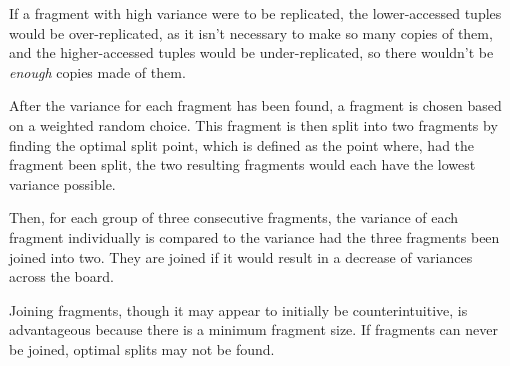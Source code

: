 \documentclass{brandiss}
\numberwithin{section}{chapter}
\numberwithin{figure}{chapter}
\theoremstyle{definition}
\theoremstyle{plain}
\theoremstyle{remark}
\begin{document}
If a fragment with high variance were to be replicated, the lower-accessed tuples would be over-replicated, as it isn't necessary to make so many copies of them, and the higher-accessed tuples would be under-replicated, so there wouldn't be \textit{enough} copies made of them.

After the variance for each fragment has been found, a fragment is chosen based on a weighted random choice. This fragment is then split into two fragments by finding the optimal split point, which is defined as the point where, had the fragment been split, the two resulting fragments would each have the lowest variance possible.

Then, for each group of three consecutive fragments, the variance of each fragment individually is compared to the variance had the three fragments been joined into two. They are joined if it would result in a decrease of variances across the board.

Joining fragments, though it may appear to initially be counterintuitive, is advantageous because there is a minimum fragment size. If fragments can never be joined, optimal splits may not be found.

\backmatter
\singlespacing

\end{document}
